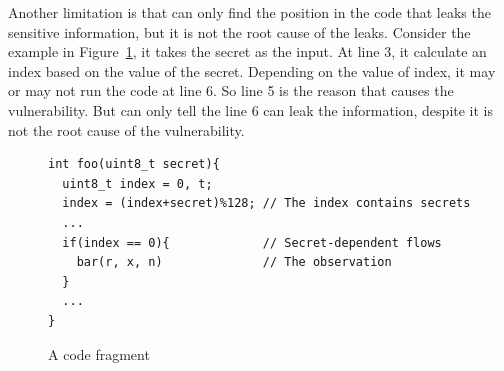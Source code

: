 Another limitation is that \ctool{} can only find the position in the code that leaks the sensitive information, but it is not the root cause of the leaks. Consider the example in Figure~\ref{fig:limitation}, it takes the secret as the input. At line 3, it calculate an index based on the value of the secret. Depending on the value of index, it may or may not run the code at line 6. So line 5 is the reason that causes the vulnerability. But \ctool{} can only tell the line 6 can leak the information, despite it is not the root cause of the vulnerability.

\begin{figure}
  \centering
  \begin{lstlisting}[xleftmargin=.02\textwidth,xrightmargin=.01\textwidth]
int foo(uint8_t secret){
  uint8_t index = 0, t;
  index = (index+secret)%128; // The index contains secrets
  ...
  if(index == 0){             // Secret-dependent flows
    bar(r, x, n)              // The observation
  }
  ...
}
\end{lstlisting}
  \caption{A code fragment}
  \label{fig:limitation}
\end{figure}

